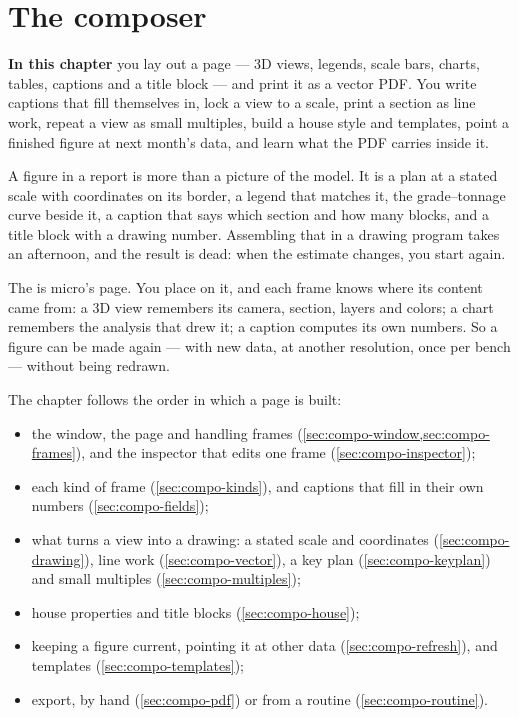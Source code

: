 \chapter{The composer}\label{ch:composer}
\begin{goals}
\textbf{In this chapter} you lay out a page — 3D views, legends, scale bars, charts, tables, captions and a title block — and print it as a vector PDF. You write captions that fill themselves in, lock a view to a scale, print a section as line work, repeat a view as small multiples, build a house style and templates, point a finished figure at next month's data, and learn what the PDF carries inside it.
\end{goals}

A figure in a report is more than a picture of the model. It is a plan at a stated scale with coordinates on its border, a legend that matches it, the grade–tonnage curve beside it, a caption that says which section and how many blocks, and a title block with a drawing number. Assembling that in a drawing program takes an afternoon, and the result is dead: when the estimate changes, you start again.

The  is micro's page. You place  on it, and each frame knows where its content came from: a 3D view remembers its camera, section, layers and colors; a chart remembers the analysis that drew it; a caption computes its own numbers. So a figure can be made again — with new data, at another resolution, once per bench — without being redrawn.

The chapter follows the order in which a page is built:

\begin{itemize}
\item the window, the page and handling frames (\cref{sec:compo-window,sec:compo-frames}), and the inspector that edits one frame (\cref{sec:compo-inspector});
\item each kind of frame (\cref{sec:compo-kinds}), and captions that fill in their own numbers (\cref{sec:compo-fields});
\item what turns a view into a drawing: a stated scale and coordinates (\cref{sec:compo-drawing}), line work (\cref{sec:compo-vector}), a key plan (\cref{sec:compo-keyplan}) and small multiples (\cref{sec:compo-multiples});
\item house properties and title blocks (\cref{sec:compo-house});
\item keeping a figure current, pointing it at other data (\cref{sec:compo-refresh}), and templates (\cref{sec:compo-templates});
\item export, by hand (\cref{sec:compo-pdf}) or from a routine (\cref{sec:compo-routine}).
\end{itemize}

